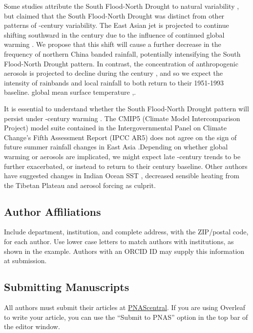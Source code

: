 \documentclass[9pt,twocolumn,twoside,lineno]{pnas-new}
\begin{document}
 Some studies attribute the South Flood-North Drought to natural variability \citep{Zhang1999,Xin2006,Lei2014}, but \citet{Zhou2009} claimed that the South Flood-North Drought was distinct from other patterns of -century variability. The East Asian jet is projected to continue shifting southward in the  century due to the influence of continued global warming \citep{Park2014}. We propose that this shift will cause a further decrease in the frequency of northern China banded rainfall, potentially intensifying the South Flood-North Drought pattern. In contrast, the concentration of anthropogenic aerosols is projected to decline during the  century \citep{Westervelt2015}, and so we expect the intensity of rainbands and local rainfall to both return to their 1951-1993 baseline. 
	global mean surface temperature \citep{Zhao2010},.
	
	It is essential to understand whether the South Flood-North Drought pattern will persist under -century warming \citep{Zhang1999,Xin2006,Lei2014}. The CMIP5 (Climate Model Intercomparison Project) model suite contained in the Intergovernmental Panel on Climate Change's Fifth Assessment Report (IPCC AR5) does not agree on the sign of future summer rainfall changes in East Asia \citep{Christensen2011}.Depending on whether global warming or aerosols are implicated, we might expect late -century trends to be further exacerbated, or instead to return to their  century baseline.
 Other authors have suggested changes in Indian Ocean SST \citep{Qu2012}, decreased sensible heating from the Tibetan Plateau \citep{Liu2012a,Hu2015} and aerosol forcing \citep{Song2014} as culprit.

\subsection*{Author Affiliations}

Include department, institution, and complete address, with the ZIP/postal code, for each author. Use lower case letters to match authors with institutions, as shown in the example. Authors with an ORCID ID may supply this information at submission.

\subsection*{Submitting Manuscripts}

All authors must submit their articles at \href{http://www.pnascentral.org/cgi-bin/main.plex}{PNAScentral}. If you are using Overleaf to write your article, you can use the ``Submit to PNAS'' option in the top bar of the editor window. 
\end{document}
